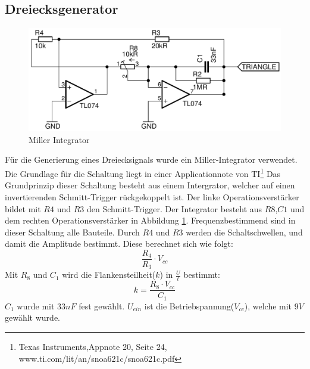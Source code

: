 \subsection{Dreiecksgenerator}
\begin{figure}[H]
\centering
 \includegraphics[scale=0.55]{gfx/triangle_generator.pdf}
 \caption{Miller Integrator}
	\label{triangle} 
\end{figure}
Für die Generierung eines Dreiecksignals wurde ein Miller-Integrator verwendet.
Die Grundlage für die Schaltung liegt in einer Applicationnote von TI\footnote{ Texas Instruments,Appnote 20, Seite 24, www.ti.com/lit/an/snoa621c/snoa621c.pdf}
Das Grundprinzip dieser Schaltung besteht aus einem Intergrator, welcher auf einen invertierenden Schmitt-Trigger rückgekoppelt ist.
Der linke Operationsverstärker bildet mit $R4$ und $R3$ den Schmitt-Trigger. Der Integrator besteht aus $R8$,$C1$ und dem rechten Operationsverstärker in Abbildung \ref{triangle}.
Frequenzbestimmend sind in dieser Schaltung alle Bauteile. Durch $R4$ und $R3$ werden die Schaltschwellen, und damit die Amplitude bestimmt. Diese berechnet sich wie folgt: 
\begin{equation}
\frac{R_4}{R_3}\cdot V_{cc}
\end{equation}
Mit $R_8$ und $C_1$ wird die Flankensteilheit($k$) in $\frac{U}{t}$ bestimmt:
\begin{equation}
k=\frac{R_8 \cdot V_{cc}}{C_1}
\end{equation}
$C_1$ wurde mit $33nF$ fest gewählt. $U_{ein}$ ist die Betriebspannung($V_{cc}$), welche mit $9V$ gewählt wurde.